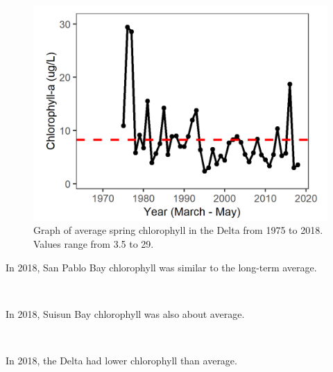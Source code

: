 \documentclass[
]{book}
\begin{document}
\begin{panel-grid}
\begin{columns-nocenter}
\begin{column800}
\begin{expand}
\begin{figure}
\includegraphics[width=15.25in]{figures/chla_dtspring} \caption{Graph of average spring chlorophyll in the Delta from 1975 to 2018. Values range from 3.5 to 29.}\label{fig:unnamed-chunk-22}
\end{figure}

\end{expand}

\end{column800}

\end{columns-nocenter}

\begin{columns-nocenter}

\begin{column800}

In 2018, San Pablo Bay chlorophyll was similar to the long-term average.

\end{column800}

\begin{column40}

~

\end{column40}

\begin{column800}

In 2018, Suisun Bay chlorophyll was also about average.

\end{column800}

\begin{column40}

~

\end{column40}

\begin{column800}

In 2018, the Delta had lower chlorophyll than average.

\end{column800}

\end{columns-nocenter}

\end{panel-grid}
\end{document}
